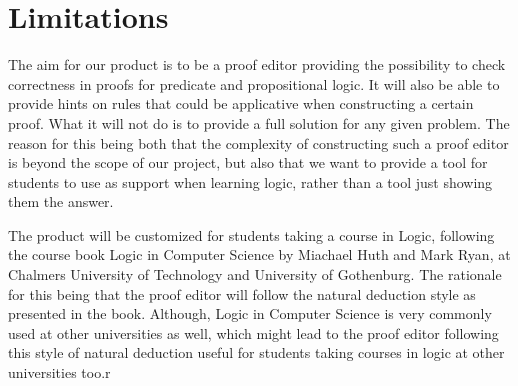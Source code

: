 \section {Limitations}

The aim for our product is to be a proof editor providing the possibility to
check correctness in proofs for predicate and propositional logic. It will also
be able to provide hints on rules that could be applicative when constructing
a certain proof. What it will not do is to provide a full solution for any given
problem. The reason for this being both that the complexity of constructing such
a proof editor is beyond the scope of our project, but also that we want to
provide a tool for students to use as support when learning logic, rather than a
tool just showing them the answer.

The product will be customized for students taking a course in Logic, following
the course book Logic in Computer Science by Miachael Huth and Mark Ryan, at
Chalmers University of Technology and University of Gothenburg. The rationale
for this being that the proof editor will follow the natural deduction style as
presented in the book. Although, Logic in Computer Science is very commonly used
at other universities as well, which might lead to the proof editor following
this style of natural deduction useful for students taking courses in logic at
other universities too.r